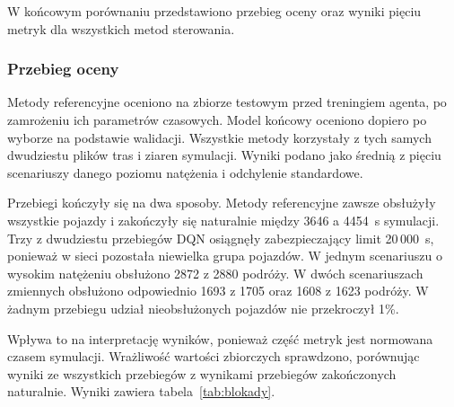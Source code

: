 W końcowym porównaniu przedstawiono przebieg oceny oraz wyniki pięciu metryk dla wszystkich metod sterowania.

\subsubsection{Przebieg oceny}
\label{subsubsec:przebieg-oceny-testowej}

Metody referencyjne oceniono na zbiorze testowym przed treningiem agenta, po zamrożeniu ich parametrów czasowych. Model końcowy oceniono dopiero po wyborze na podstawie walidacji. Wszystkie metody korzystały z tych samych dwudziestu plików tras i ziaren symulacji. Wyniki podano jako średnią z pięciu scenariuszy danego poziomu natężenia i odchylenie standardowe.

Przebiegi kończyły się na dwa sposoby. Metody referencyjne zawsze obsłużyły wszystkie pojazdy i zakończyły się naturalnie między 3646 a 4454~s symulacji. Trzy z dwudziestu przebiegów DQN osiągnęły zabezpieczający limit 20\,000~s, ponieważ w sieci pozostała niewielka grupa pojazdów. W jednym scenariuszu o wysokim natężeniu obsłużono 2872 z 2880 podróży. W dwóch scenariuszach zmiennych obsłużono odpowiednio 1693 z 1705 oraz 1608 z 1623 podróży. W żadnym przebiegu udział nieobsłużonych pojazdów nie przekroczył 1\%.

Wpływa to na interpretację wyników, ponieważ część metryk jest normowana czasem symulacji. Wrażliwość wartości zbiorczych sprawdzono, porównując wyniki ze wszystkich przebiegów z wynikami przebiegów zakończonych naturalnie. Wyniki zawiera tabela~\ref{tab:blokady}.

